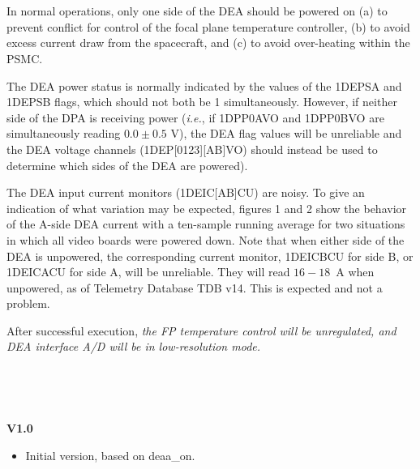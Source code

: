 \documentclass[11pt]{article}
\begin{document}
\vspace{0.15in}
\normalsize
{} \\
\normalsize

\normalsize
{} \\
\normalsize
In normal operations, only one side of the DEA should be powered on
(a) to prevent conflict for control of the focal plane temperature controller,
(b) to avoid excess current draw from the spacecraft, and (c) to avoid over-heating
within the PSMC.

The DEA power status is normally indicated by the values of the 1DEPSA and
1DEPSB flags, which should not both be 1 simultaneously.
However, if neither side of the DPA is receiving power
({\it i.e.}, if 1DPP0AVO and 1DPP0BVO are simultaneously reading $0.0 \pm 0.5$ V),
the DEA flag values will be unreliable and the DEA voltage
channels (1DEP[0123][AB]VO) should instead be used to determine which
sides of the DEA are powered).

The DEA input current monitors (1DEIC[AB]CU) are noisy.
To give an indication of what variation may be expected, figures 1 and 2
show the behavior of the A-side DEA current with a ten-sample running
average for two situations in which all video boards were powered down.
Note that when either side of the DEA is unpowered, the corresponding current monitor,
1DEICBCU for side B, or 1DEICACU for side A, will be unreliable.
They will read $16-18$~A when unpowered, as of Telemetry Database TDB v14.
This is expected and not a problem.

After successful execution, {\em the FP temperature control will be unregulated,
and DEA interface A/D will be in low-resolution mode.}

\vspace{0.15in}
\normalsize
{} \\
\normalsize

\normalsize
{} \\
\normalsize

{\bf V1.0}
\begin{itemize}
\item Initial version, based on deaa\_on.
\end{itemize}
\end{document}
